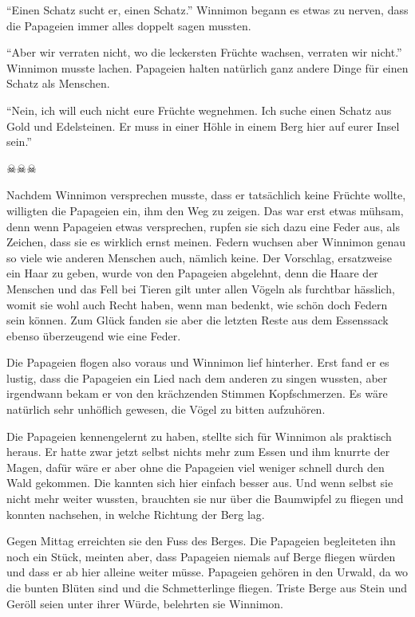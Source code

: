\enquote{Einen Schatz sucht er, einen Schatz.} Winnimon begann es etwas zu nerven, dass die Papageien immer alles doppelt sagen mussten.

\enquote{Aber wir verraten nicht, wo die leckersten Früchte wachsen, verraten wir nicht.} Winnimon musste lachen. Papageien halten natürlich ganz andere Dinge für einen Schatz als Menschen.

\enquote{Nein, ich will euch nicht eure Früchte wegnehmen. Ich suche einen Schatz aus Gold und Edelsteinen. Er muss in einer Höhle in einem Berg hier auf eurer Insel sein.}

\begin{center}
{\color{DeepPink} $\skull \skull \skull$}
\end{center}

Nachdem Winnimon versprechen musste, dass er tatsächlich keine Früchte wollte, willigten die Papageien ein, ihm den Weg zu zeigen. Das war erst etwas mühsam, denn wenn Papageien etwas versprechen, rupfen sie sich dazu eine Feder aus, als Zeichen, dass sie es wirklich ernst meinen. Federn wuchsen aber Winnimon genau so viele wie anderen Menschen auch, nämlich keine. Der Vorschlag, ersatzweise ein Haar zu geben, wurde von den Papageien abgelehnt, denn die Haare der Menschen und das Fell bei Tieren gilt unter allen Vögeln als furchtbar hässlich, womit sie wohl auch Recht haben, wenn man bedenkt, wie schön doch Federn sein können. Zum Glück fanden sie aber die letzten Reste aus dem Essenssack ebenso überzeugend wie eine Feder. 

Die Papageien flogen also voraus und Winnimon lief hinterher. Erst fand er es lustig, dass die Papageien ein Lied nach dem anderen zu singen wussten, aber irgendwann bekam er von den krächzenden Stimmen Kopfschmerzen. Es wäre natürlich sehr unhöflich gewesen, die Vögel zu bitten aufzuhören. 

Die Papageien kennengelernt zu haben, stellte sich für Winnimon als praktisch heraus. Er hatte zwar jetzt selbst nichts mehr zum Essen und ihm knurrte der Magen, dafür wäre er aber ohne die Papageien viel weniger schnell durch den Wald gekommen. Die kannten sich hier einfach besser aus. Und wenn selbst sie nicht mehr weiter wussten, brauchten sie nur über die Baumwipfel zu fliegen und konnten nachsehen, in welche Richtung der Berg lag.

Gegen Mittag erreichten sie den Fuss des Berges. Die Papageien begleiteten ihn noch ein Stück, meinten aber, dass Papageien niemals auf Berge fliegen würden und dass er ab hier alleine weiter müsse. Papageien gehören in den Urwald, da wo die bunten Blüten sind und die Schmetterlinge fliegen. Triste Berge aus Stein und Geröll seien unter ihrer Würde, belehrten sie Winnimon.

